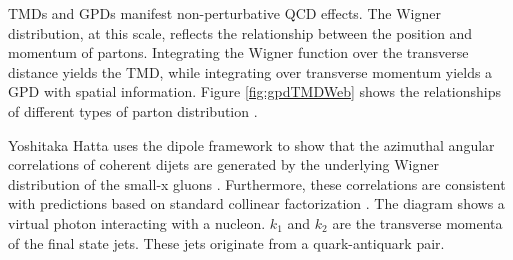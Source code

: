 TMDs and GPDs manifest non-perturbative QCD effects. The Wigner distribution, at this scale, reflects the relationship between the position and momentum of partons. Integrating the Wigner function over the transverse distance yields the TMD, while integrating over transverse momentum yields a GPD with spatial information. Figure \ref{fig:gpdTMDWeb} shows the relationships of different types of parton distribution \cite{Diehl:2003ny}.  

Yoshitaka Hatta uses the dipole framework to show that the azimuthal angular correlations of coherent dijets are generated by the underlying Wigner distribution of the small-x gluons \cite{Hatta:2017cte}. Furthermore, these correlations are consistent with predictions based on standard collinear factorization \cite{Hatta:2016dxp}. The diagram shows a virtual photon interacting with a nucleon. $k_1$ and $k_2$ are the transverse momenta of the final state jets. These jets originate from a quark-antiquark pair\cite{Hagiwara:2016kam}. 

